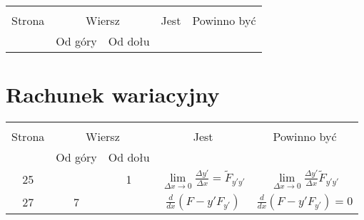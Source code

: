 \documentclass[a4paper,11pt]{article}
\begin{document}


\begin{center}

  \begin{tabular}{|c|c|c|c|c|}
    \hline
    & \multicolumn{2}{c|}{} & & \\
    Strona & \multicolumn{2}{c|}{Wiersz} & Jest
                              & Powinno być \\ \cline{2-3}
    & Od góry & Od dołu & & \\
    \hline
    \hline
  \end{tabular}

\end{center}











\newpage
\section{Rachunek wariacyjny}

\vspace{\spaceTwo}







\begin{center}

  \begin{tabular}{|c|c|c|c|c|}
    \hline
    & \multicolumn{2}{c|}{} & & \\
    Strona & \multicolumn{2}{c|}{Wiersz} & Jest
                              & Powinno być \\ \cline{2-3}
    & Od góry & Od dołu & & \\
    \hline
    25  & &  1 & $\lim\limits_{ \Delta x \to 0 }
                 \frac{ \Delta y' }{ \Delta x } = \tilde{ F }_{ y' y' }$
           & $\lim\limits_{ \Delta x \to 0 }
             \frac{ \Delta y' }{ \Delta x } \tilde{ F }_{ y' y' }$ \\
    27  &  7 & & $\frac{ d }{ dx }( F - y' F_{ y' } )$
           & $\frac{ d }{ dx }( F - y' F_{ y' } ) = 0$ \\
    \hline
  \end{tabular}

\end{center}
\end{document}
